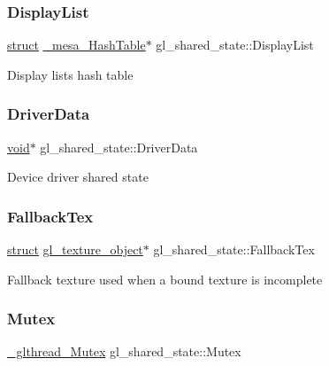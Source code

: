 \subsubsection{\texorpdfstring{Display\+List}{DisplayList}}
{\footnotesize\ttfamily \hyperlink{interfacestruct}{struct} \hyperlink{struct__mesa___hash_table}{\+\_\+mesa\+\_\+\+Hash\+Table}$\ast$ gl\+\_\+shared\+\_\+state\+::\+Display\+List}

Display lists hash table \mbox{\label{structgl__shared__state_ac6708d3375b660229f23fb3f297767ae}} 
\subsubsection{\texorpdfstring{Driver\+Data}{DriverData}}
{\footnotesize\ttfamily \hyperlink{interfacevoid}{void}$\ast$ gl\+\_\+shared\+\_\+state\+::\+Driver\+Data}

Device driver shared state \mbox{\label{structgl__shared__state_a26c7b5a32fa072428a75f3b9498403f1}} 
\subsubsection{\texorpdfstring{Fallback\+Tex}{FallbackTex}}
{\footnotesize\ttfamily \hyperlink{interfacestruct}{struct} \hyperlink{structgl__texture__object}{gl\+\_\+texture\+\_\+object}$\ast$ gl\+\_\+shared\+\_\+state\+::\+Fallback\+Tex}

Fallback texture used when a bound texture is incomplete \mbox{\label{structgl__shared__state_ad1848576f749312009f9b08da0a9a662}} 
\subsubsection{\texorpdfstring{Mutex}{Mutex}}
{\footnotesize\ttfamily \hyperlink{struct___c_r_i_t_i_c_a_l___s_e_c_t_i_o_n}{\+\_\+glthread\+\_\+\+Mutex} gl\+\_\+shared\+\_\+state\+::\+Mutex}

